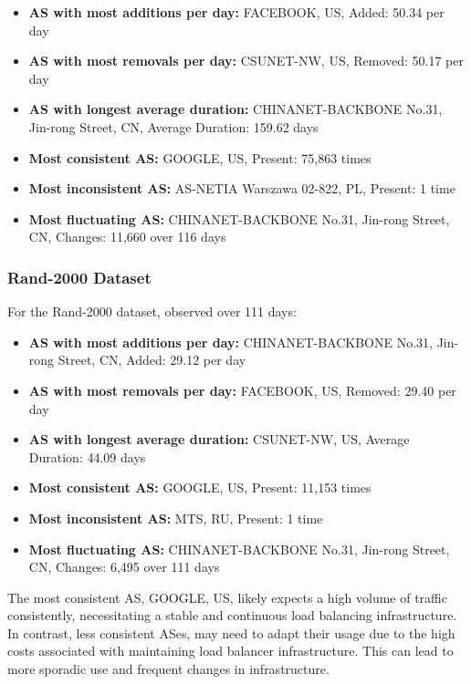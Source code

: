 \documentclass[12pt]{cwru_thesis}
\begin{document}
\begin{itemize}
    \item \textbf{AS with most additions per day:} FACEBOOK, US, Added: 50.34 per day
    \item \textbf{AS with most removals per day:} CSUNET-NW, US, Removed: 50.17 per day
    \item \textbf{AS with longest average duration:} CHINANET-BACKBONE No.31, Jin-rong Street, CN, Average Duration: 159.62 days
    \item \textbf{Most consistent AS:} GOOGLE, US, Present: 75,863 times
    \item \textbf{Most inconsistent AS:} AS-NETIA Warszawa 02-822, PL, Present: 1 time
    \item \textbf{Most fluctuating AS:} CHINANET-BACKBONE No.31, Jin-rong Street, CN, Changes: 11,660 over 116 days
\end{itemize}

\subsubsection{Rand-2000 Dataset}

For the Rand-2000 dataset, observed over 111 days:

\begin{itemize}
    \item \textbf{AS with most additions per day:} CHINANET-BACKBONE No.31, Jin-rong Street, CN, Added: 29.12 per day
    \item \textbf{AS with most removals per day:} FACEBOOK, US, Removed: 29.40 per day
    \item \textbf{AS with longest average duration:} CSUNET-NW, US, Average Duration: 44.09 days
    \item \textbf{Most consistent AS:} GOOGLE, US, Present: 11,153 times
    \item \textbf{Most inconsistent AS:} MTS, RU, Present: 1 time
    \item \textbf{Most fluctuating AS:} CHINANET-BACKBONE No.31, Jin-rong Street, CN, Changes: 6,495 over 111 days
\end{itemize}


The most consistent AS, GOOGLE, US, likely expects a high volume of traffic consistently, necessitating a stable and continuous load balancing infrastructure. In contrast, less consistent ASes, may need to adapt their usage due to the high costs associated with maintaining load balancer infrastructure. This can lead to more sporadic use and frequent changes in infrastructure.
\end{document}
